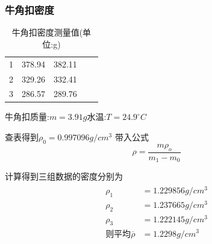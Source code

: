 \documentclass[12pt,a4paper,UTF8]{ctexart}
\begin{document}
\subsubsection*{牛角扣密度}
\begin{table}[!htbp]
	\centering
	\caption{牛角扣密度测量值(单位:g)}
	\begin{tabular}{ccccc}
		\toprule
		\makebox[0.1\textwidth][c]{次数}&\makebox[0.1\textwidth][c]{$m_0$}&\makebox[0.1\textwidth][c]{$m_1$}\\
		\midrule
		1 & 378.94 & 382.11 	\\
		2 & 329.26 & 332.41		\\
		3 & 286.57 & 289.76 	\\
		\bottomrule
	\end{tabular}
\end{table}
\vspace*{-0.75cm}
\begin{center}
	牛角扣质量:$m=3.91g$\quad 水温:$T=24.9^{\circ} C$
\end{center}
\par 查表得到$\rho_0 = 0.997096 g/cm^3$ 带入公式
\[
	\rho = \frac{m \rho_o}{m_1-m_0}
\]
\par 计算得到三组数据的密度分别为
\begin{align*}
	\begin{aligned}
		\rho_1 &= 1.229856 g/cm^3\\
		\rho_2 &= 1.237665 g/cm^3\\
		\rho_3 &= 1.222145 g/cm^3\\
		\text{则平均}\overline{\rho} &= 1.2298 g/cm^3\\
	\end{aligned}
\end{align*}
\end{document}
